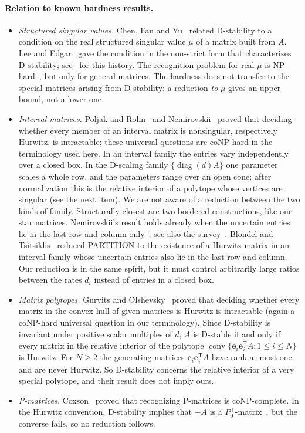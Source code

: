 \documentclass[11pt,a4paper]{article}
\theoremstyle{plain}
\theoremstyle{definition}
\theoremstyle{remark}
\newcommand{\diag}{\operatorname{diag}}
\newcommand{\be}{\mathbf{e}}
\begin{document}
\paragraph{Relation to known hardness results.}
\begin{itemize}
\item \emph{Structured singular values.} Chen, Fan and Yu~\cite{chen1995} related
D-stability to a condition on the real structured singular value $\mu$ of a matrix
built from $A$. Lee and Edgar~\cite{lee2001} gave the condition in the non-strict form
that characterizes D-stability; see~\cite{kushel2019} for this history. The recognition
problem for real $\mu$ is NP-hard~\cite{braatz1994}, but only for general matrices. The
hardness does not transfer to the special matrices arising from D-stability: a
reduction \emph{to} $\mu$ gives an upper bound, not a lower one.
\item \emph{Interval matrices.} Poljak and Rohn~\cite{poljak1993} and
Nemirovskii~\cite{nemirovskii1993} proved that deciding whether every member of an
interval matrix is nonsingular, respectively Hurwitz, is intractable; these universal
questions are coNP-hard in the terminology used here. In an interval family the entries
vary independently over a closed box. In the D-scaling family $\{\diag(d)A\}$ one
parameter scales a whole row, and the parameters range over an open cone; after
normalization this is the relative interior of a polytope whose vertices are singular
(see the next item). We are not aware of a reduction between the two kinds of family.
Structurally closest are two bordered constructions, like our star matrices.
Nemirovskii's result holds already when the uncertain entries lie in the last row and
column only~\cite{nemirovskii1993}; see also the survey~\cite{horacek2017}. Blondel and
Tsitsiklis~\cite{blondel1997} reduced PARTITION to the existence of a Hurwitz matrix in
an interval family whose uncertain entries also lie in the last row and column. Our
reduction is in the same spirit, but it must control arbitrarily large ratios between
the rates $d_i$ instead of entries in a closed box.
\item \emph{Matrix polytopes.} Gurvits and Olshevsky~\cite{gurvits2009} proved that
deciding whether every matrix in the convex hull of given matrices is Hurwitz is
intractable (again a coNP-hard universal question in our terminology).
Since D-stability is invariant under positive scalar multiples of $d$, $A$ is D-stable if
and only if every matrix in the relative interior of the polytope
$\operatorname{conv}\{\be_i\be_i^{\mathsf T}A: 1\le i\le N\}$ is Hurwitz. For $N\ge2$ the
generating matrices $\be_i\be_i^{\mathsf T}A$ have rank at most one and are never Hurwitz. So
D-stability concerns the relative interior of a very special polytope, and their result
does not imply ours.
\item \emph{P-matrices.} Coxson~\cite{coxson1994} proved that recognizing P-matrices is
coNP-complete. In the Hurwitz convention, D-stability implies that $-A$ is a
$P_0^+$-matrix~\cite{cross1978}, but the converse fails, so no reduction follows.
\end{itemize}
\end{document}
